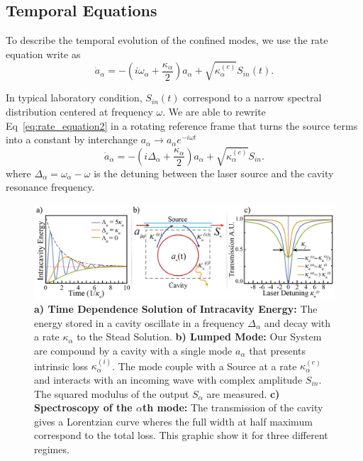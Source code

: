 \subsection{Temporal Equations}

To describe the temporal evolution of the confined modes, we use the rate equation write as 
\begin{equation}
    \dot{a}_\alpha = -\left(i\omega_\alpha +\frac{\kappa_\alpha}{2}\right)a_\alpha +\sqrt{\kappa^{(e)}_\alpha}S_{in}(t).
    \label{eq:rate_equation2}
\end{equation} 

In typical laboratory condition, $S_{in}(t)$ correspond to a narrow spectral distribution centered at frequency $\omega$. We are able to rewrite Eq~\ref{eq:rate_equation2} in a rotating reference frame that turns the source terms into a constant by interchange $a_\alpha \rightarrow a_\alpha e^{-i\omega t}$
\begin{equation}
    \dot{a}_\alpha = -\left(i\Delta_\alpha +\frac{\kappa_\alpha}{2}\right)a_\alpha +\sqrt{\kappa^{(e)}_\alpha}S_{in}.
    \label{eq:rate_equation_unperturbed}
\end{equation}
where $\Delta_\alpha = \omega_\alpha - \omega$ is the detuning between the laser source and the cavity resonance frequency.
\begin{figure}[t!]
    \centering
    \includegraphics[width = 16cm]{Dissertation_rate_equation.jpg}
    \caption{\textbf{a) Time Dependence Solution of Intracavity Energy:} The energy stored in a cavity oscillate in a frequency $\Delta_\alpha$ and decay with a rate $\kappa_\alpha$ to the Stead Solution. \textbf{b) Lumped Mode:} Our System are compound by a cavity with a single mode $a_\alpha$ that presents intrinsic loss $\kappa_\alpha^{(i)}$. The mode couple with a Source at a rate $\kappa_\alpha^{(e)}$ and interacts with an incoming wave with complex amplitude $S_{in}$. The squared modulus of the output $S_\alpha$ are measured. \textbf{c) Spectroscopy of the $\alpha$th mode:} The transmission of the cavity gives a Lorentzian curve wheres the full width at half maximum correspond to the total loss. This graphic show it for three different regimes.}
    \label{fig:rate_equations_single_mode}
\end{figure}

